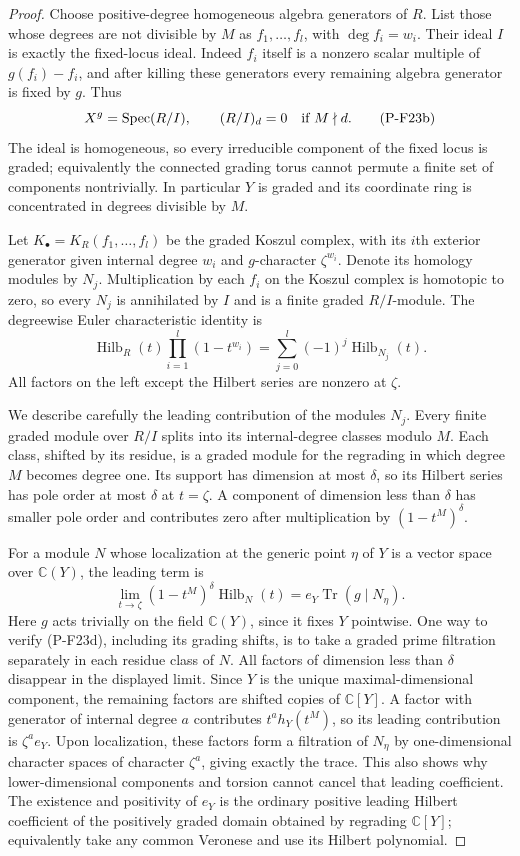 \begin{proof}
Choose positive-degree homogeneous algebra generators of $R$.
List those whose degrees are not divisible by $M$ as
$f_1,\ldots,f_l$, with $\deg f_i=w_i$. Their ideal $I$
is exactly the fixed-locus ideal. Indeed $f_i$ itself is a
nonzero scalar multiple of $g(f_i)-f_i$, and after killing
these generators every remaining algebra generator is fixed
by $g$. Thus
\[
 X^g=\operatorname{Spec}(R/I),
 \qquad (R/I)_d=0\quad\hbox{if }M\nmid d.
 \tag{P-F23b}
\]
The ideal is homogeneous, so every irreducible component of
the fixed locus is graded; equivalently the connected grading
torus cannot permute a finite set of components nontrivially.
In particular $Y$ is graded and its coordinate ring is
concentrated in degrees divisible by $M$.

Let $K_\bullet=K_R(f_1,\ldots,f_l)$ be the graded Koszul
complex, with its $i$th exterior generator given internal degree
$w_i$ and $g$-character $\zeta^{w_i}$. Denote its homology
modules by $N_j$. Multiplication by each $f_i$ on the Koszul
complex is homotopic to zero, so every $N_j$ is annihilated
by $I$ and is a finite graded $R/I$-module. The degreewise
Euler characteristic identity is
\[
 \operatorname{Hilb}_R(t)\prod_{i=1}^l(1-t^{w_i})
       =\sum_{j=0}^l(-1)^j\operatorname{Hilb}_{N_j}(t).
 \tag{P-F23c}
\]
All factors on the left except the Hilbert series are nonzero
at $\zeta$.

We describe carefully the leading contribution of the modules
$N_j$. Every finite graded module over $R/I$ splits into its
internal-degree classes modulo $M$. Each class, shifted by
its residue, is a graded module for the regrading in which
degree $M$ becomes degree one. Its support has dimension at
most $\delta$, so its Hilbert series has pole order at most
$\delta$ at $t=\zeta$. A component of dimension less than
$\delta$ has smaller pole order and contributes zero after
multiplication by $(1-t^M)^\delta$.

For a module $N$ whose localization at the generic point
$\eta$ of $Y$ is a vector space over $\mathbb C(Y)$, the
leading term is
\[
 \lim_{t\to\zeta}(1-t^M)^\delta\operatorname{Hilb}_N(t)
       = e_Y\operatorname{Tr}(g\mid N_\eta).
 \tag{P-F23d}
\]
Here $g$ acts trivially on the field $\mathbb C(Y)$, since it
fixes $Y$ pointwise. One way to verify (P-F23d), including its
grading shifts, is to take a graded prime filtration separately
in each residue class of $N$. All factors of dimension less
than $\delta$ disappear in the displayed limit. Since $Y$ is
the unique maximal-dimensional component, the remaining factors
are shifted copies of $\mathbb C[Y]$. A factor with generator
of internal degree $a$ contributes
$t^a h_Y(t^M)$, so its leading contribution is
$\zeta^a e_Y$. Upon localization, these factors form a
filtration of $N_\eta$ by one-dimensional character spaces of
character $\zeta^a$, giving exactly the trace. This also shows
why lower-dimensional components and torsion cannot cancel
that leading coefficient. The existence and positivity of
$e_Y$ is the ordinary positive leading Hilbert coefficient
of the positively graded domain obtained by regrading
$\mathbb C[Y]$; equivalently take any common Veronese and
use its Hilbert polynomial.


\end{proof}
